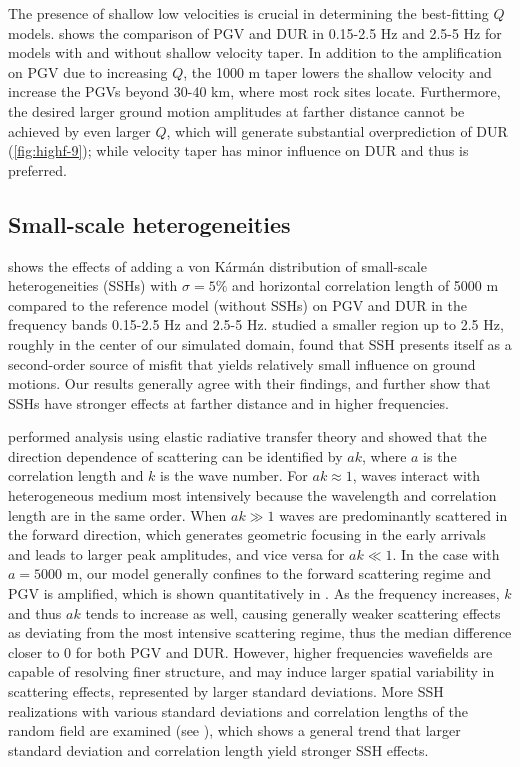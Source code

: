 The presence of shallow low velocities is crucial in determining the best-fitting $Q$ models.  shows the comparison of PGV and DUR in 0.15-2.5 Hz and 2.5-5 Hz for models with and without shallow velocity taper. In addition to the amplification on PGV due to increasing $Q$, the 1000 m taper lowers the shallow velocity and increase the PGVs beyond 30-40 km, where most rock sites locate. Furthermore, the desired larger ground motion amplitudes at farther distance cannot be achieved by even larger $Q$, which will generate substantial overprediction of DUR (\cref{fig:highf-9}); while velocity taper has minor influence on DUR and thus is preferred.

\subsection{Small-scale heterogeneities}
 shows the effects of adding a von K\'arm\'an distribution of small-scale heterogeneities (SSHs) with $\sigma = 5\%$ and horizontal correlation length of 5000 m compared to the reference model (without SSHs) on PGV and DUR in the frequency bands 0.15-2.5 Hz and 2.5-5 Hz. \citet{savranGroundMotionSimulation2019} studied a smaller region up to 2.5 Hz, roughly in the center of our simulated domain, found that SSH presents itself as a second-order source of misfit that yields relatively small influence on ground motions. Our results generally agree with their findings, and further show that SSHs have stronger effects at farther distance and in higher frequencies.

\citet{przybillaEstimationCrustalScattering2009} performed analysis using elastic radiative transfer theory and showed that the direction dependence of scattering can be identified by $ak$, where $a$ is the correlation length and $k$ is the wave number. For $ak \approx 1$, waves interact with heterogeneous medium most intensively because the wavelength and correlation length are in the same order. When $ak\gg 1$ waves are predominantly scattered in the forward direction, which generates geometric focusing in the early arrivals and leads to larger peak amplitudes, and vice versa for $ak \ll 1$. In the case with $a=5000$ m, our model generally confines to the forward scattering regime and PGV is amplified, which is shown quantitatively in . As the frequency increases, $k$ and thus $ak$ tends to increase as well, causing generally weaker scattering effects as deviating from the most intensive scattering regime, thus the median difference closer to 0 for both PGV and DUR. However, higher frequencies wavefields are capable of resolving finer structure, and may induce larger spatial variability in scattering effects, represented by larger standard deviations. More SSH realizations with various standard deviations and correlation lengths of the random field are examined (see ), which shows a general trend that larger standard deviation and correlation length yield stronger SSH effects.


